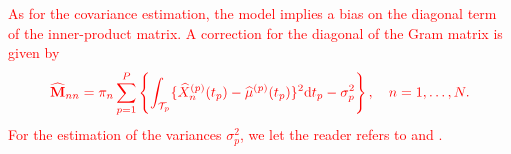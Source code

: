 \textcolor{red}{As for the covariance estimation, the model implies a bias on the diagonal term of the inner-product matrix. A correction for the diagonal of the Gram matrix is given by}
\begin{equation}
    \textcolor{red}{\widehat{\mathbf{M}}_{nn} = \pi_n\sum_{p = 1}^P \left\{\int_{\mathcal{T}_{p}}\{\widehat{X}_n^{(p)}(t_p) - \widehat{\mu}^{(p)}(t_p)\}^2 {\rm d} t_p - \sigma_p^2 \right\}, \quad n = 1, \dots, N.}
\end{equation}
\textcolor{red}{For the estimation of the variances $\sigma_p^2$, we let the reader refers to \cite{hallVarianceEstimationNonparametric1990} and \cite{hallAsymptoticallyOptimalDifferenceBased1990}.}


